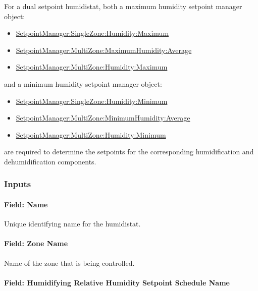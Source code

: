For a dual setpoint humidistat, both a maximum humidity setpoint manager object:

\begin{itemize}
\item
  \hyperref[setpointmanagersinglezonehumiditymaximum]{SetpointManager:SingleZone:Humidity:Maximum}
\item
  \hyperref[setpointmanagermultizonemaximumhumidityaverage]{SetpointManager:MultiZone:MaximumHumidity:Average}
\item
  \hyperref[setpointmanagermultizonehumiditymaximum]{SetpointManager:MultiZone:Humidity:Maximum}
\end{itemize}

and a minimum humidity setpoint manager object:

\begin{itemize}
\item
  \hyperref[setpointmanagersinglezonehumidityminimum]{SetpointManager:SingleZone:Humidity:Minimum}
\item
  \hyperref[setpointmanagermultizoneminimumhumidityaverage]{SetpointManager:MultiZone:MinimumHumidity:Average}
\item
  \hyperref[setpointmanagermultizonehumidityminimum]{SetpointManager:MultiZone:Humidity:Minimum}
\end{itemize}

are required to determine the setpoints for the corresponding humidification and dehumidification components.

\subsubsection{Inputs}\label{inputs-8-028}

\paragraph{Field: Name}\label{field-name-6-026}

Unique identifying name for the humidistat.

\paragraph{Field: Zone Name}\label{field-zone-name-014}

Name of the zone that is being controlled.

\paragraph{Field: Humidifying Relative Humidity Setpoint Schedule Name}\label{field-humidifying-relative-humidity-setpoint-schedule-name}

